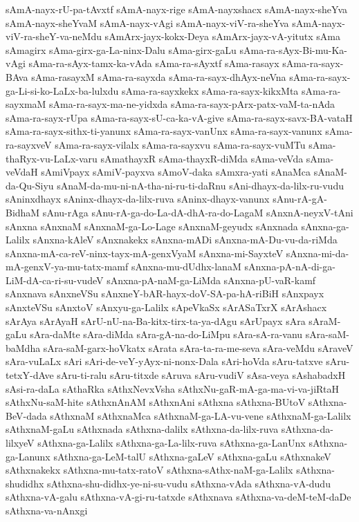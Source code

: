 {sAmA-nayx-rU-pa-tAvxtf
sAmA-nayx-rige
sAmA-nayxshacx
sAmA-nayx-sheYva
sAmA-nayx-sheYvaM
sAmA-nayx-vAgi
sAmA-nayx-viV-ra-sheYva
sAmA-nayx-viV-ra-sheY-va-neMdu
sAmArx-jayx-kokx-Deya
sAmArx-jayx-vA-yitutx
sAma
sAmagirx
sAma-girx-ga-La-ninx-Dalu
sAma-girx-gaLu
sAma-ra-sAyx-Bi-mu-Ka-vAgi
sAma-ra-sAyx-tamx-ka-vAda
sAma-ra-sAyxtf
sAma-rasayx
sAma-ra-sayx-BAva
sAma-rasayxM
sAma-ra-sayxda
sAma-ra-sayx-dhAyx-neVna
sAma-ra-sayx-ga-Li-si-ko-LaLx-ba-lulxdu
sAma-ra-sayxkekx
sAma-ra-sayx-kikxMta
sAma-ra-sayxmaM
sAma-ra-sayx-ma-ne-yidxda
sAma-ra-sayx-pArx-patx-vaM-ta-nAda
sAma-ra-sayx-rUpa
sAma-ra-sayx-sU-ca-ka-vA-give
sAma-ra-sayx-savx-BA-vataH
sAma-ra-sayx-sithx-ti-yanunx
sAma-ra-sayx-vanUnx
sAma-ra-sayx-vanunx
sAma-ra-sayxveV
sAma-ra-sayx-vilalx
sAma-ra-sayxvu
sAma-ra-sayx-vuMTu
sAma-thaRyx-vu-LaLx-varu
sAmathayxR
sAma-thayxR-diMda
sAma-veVda
sAma-veVdaH
sAmiVpayx
sAmiV-payxva
sAmoV-daka
sAmxra-yati
sAnaMca
sAnaM-da-Qu-Siyu
sAnaM-da-mu-ni-nA-tha-ni-ru-ti-daRnu
sAni-dhayx-da-lilx-ru-vudu
sAninxdhayx
sAninx-dhayx-da-lilx-ruva
sAninx-dhayx-vanunx
sAnu-rA-gA-BidhaM
sAnu-rAga
sAnu-rA-ga-do-La-dA-dhA-ra-do-LagaM
sAnxnA-neyxV-tAni
sAnxna
sAnxnaM
sAnxnaM-ga-Lo-Lage
sAnxnaM-geyudx
sAnxnada
sAnxna-ga-Lalilx
sAnxna-kAleV
sAnxnakekx
sAnxna-mADi
sAnxna-mA-Du-vu-da-riMda
sAnxna-mA-ca-reV-ninx-tayx-mA-genxVyaM
sAnxna-mi-SayxteV
sAnxna-mi-da-mA-genxV-ya-mu-tatx-mamf
sAnxna-mu-dUdhx-lanaM
sAnxna-pA-nA-di-ga-LiM-dA-ca-ri-su-vudeV
sAnxna-pA-naM-ga-LiMda
sAnxna-pU-vaR-kamf
sAnxnava
sAnxneVSu
sAnxneY-bAR-hayx-doV-SA-pa-hA-riBiH
sAnxpayx
sAnxteVSu
sAnxtoV
sAnxyu-ga-Lalilx
sApeVkaSx
sArASaTxrX
sArAshacx
sArAya
sArAyaH
sArU-nU-na-Ba-kitx-tirx-ta-ya-dAgu
sArUpayx
sAra
sAraM-gaLu
sAra-daMte
sAra-diMda
sAra-gA-na-do-LiMpu
sAra-sA-ra-vanu
sAra-saM-baMdha
sAra-saM-garx-hoVkatx
sArata
sAra-ta-ra-me-seva
sAra-veMdu
sAraveV
sAra-vuLaLx
sAri
sAri-de-veY-yAyx-ni-nonx-Dala
sAri-hoVda
sAru-tatxve
sAru-tetxY-dAve
sAru-ti-ralu
sAru-titxde
sAruva
sAru-vudiV
sAsa-veya
sAshabadxH
sAsi-ra-daLa
sAthaRka
sAthxNevxVsha
sAthxNu-gaR-mA-ga-ma-vi-va-jiRtaH
sAthxNu-saM-hite
sAthxnAnAM
sAthxnAni
sAthxna
sAthxna-BUtoV
sAthxna-BeV-dada
sAthxnaM
sAthxnaMca
sAthxnaM-ga-LA-vu-vene
sAthxnaM-ga-Lalilx
sAthxnaM-gaLu
sAthxnada
sAthxna-dalilx
sAthxna-da-lilx-ruva
sAthxna-da-lilxyeV
sAthxna-ga-Lalilx
sAthxna-ga-La-lilx-ruva
sAthxna-ga-LanUnx
sAthxna-ga-Lanunx
sAthxna-ga-LeM-talU
sAthxna-gaLeV
sAthxna-gaLu
sAthxnakeV
sAthxnakekx
sAthxna-mu-tatx-ratoV
sAthxna-sAthx-naM-ga-Lalilx
sAthxna-shudidhx
sAthxna-shu-didhx-ye-ni-su-vudu
sAthxna-vAda
sAthxna-vA-dudu
sAthxna-vA-galu
sAthxna-vA-gi-ru-tatxde
sAthxnava
sAthxna-va-deM-teM-daDe
sAthxna-va-nAnxgi
}
